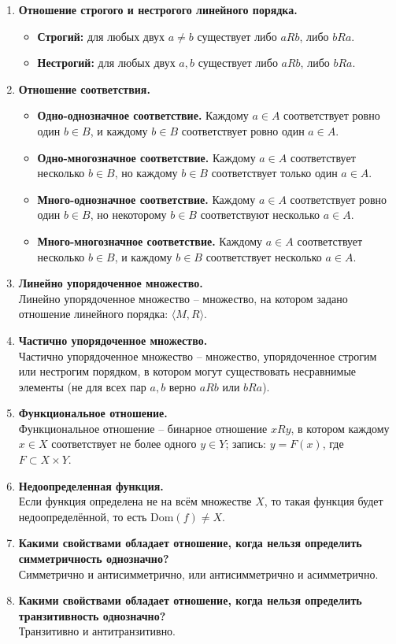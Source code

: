 \documentclass[a4paper,12pt,oneside]{article}
\newcommand{\Dom}{\mathrm{Dom}}
\newcommand{\DefItem}[2]{\item \textbf{#1}\\#2}
\begin{document}
\begin{enumerate}[label=\arabic*.]
\DefItem{Отношение строгого и нестрогого линейного порядка.}{
\begin{itemize}
\item \textbf{Строгий:} для любых двух $a\ne b$ существует либо $aRb$, либо $bRa$.
\item \textbf{Нестрогий:} для любых двух $a,b$ существует либо $aRb$, либо $bRa$.
\end{itemize}}

\DefItem{Отношение соответствия.}{
\begin{itemize}
\item \textbf{Одно-однозначное соответствие.} Каждому $a\in A$ соответствует ровно один $b\in B$, и каждому $b\in B$ соответствует ровно один $a\in A$.
\item \textbf{Одно-многозначное соответствие.} Каждому $a\in A$ соответствует несколько $b\in B$, но каждому $b\in B$ соответствует только один $a\in A$.
\item \textbf{Много-однозначное соответствие.} Каждому $a\in A$ соответствует ровно один $b\in B$, но некоторому $b\in B$ соответствуют несколько $a\in A$.
\item \textbf{Много-многозначное соответствие.} Каждому $a\in A$ соответствует несколько $b\in B$, и каждому $b\in B$ соответствует несколько $a\in A$.
\end{itemize}}

\DefItem{Линейно упорядоченное множество.}{Линейно упорядоченное множество – множество, на котором задано отношение линейного порядка: $\langle M,R\rangle$.}

\DefItem{Частично упорядоченное множество.}{Частично упорядоченное множество – множество, упорядоченное строгим или нестрогим порядком, в котором могут существовать несравнимые элементы (не для всех пар $a,b$ верно $aRb$ или $bRa$).}

\DefItem{Функциональное отношение.}{Функциональное отношение – бинарное отношение $xRy$, в котором каждому $x\in X$ соответствует не более одного $y\in Y$; запись: $y=F(x)$, где $F \subset X \times Y$.}

\DefItem{Недоопределенная функция.}{Если функция определена не на всём множестве $X$, то такая функция будет недоопределённой, то есть $\Dom(f)\ne X$.}

\DefItem{Какими свойствами обладает отношение, когда нельзя определить симметричность однозначно?}{Симметрично и антисимметрично, или антисимметрично и асимметрично.}

\DefItem{Какими свойствами обладает отношение, когда нельзя определить транзитивность однозначно?}{Транзитивно и антитранзитивно.}

\end{enumerate}
\end{document}
